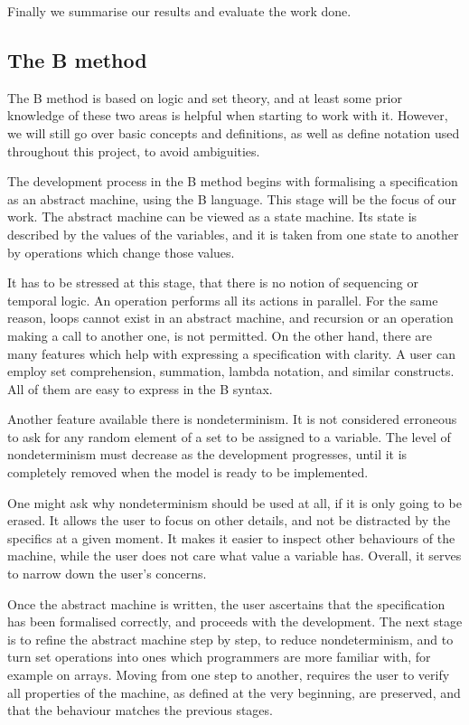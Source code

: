 \documentclass[12pt,journal,duplex]{IEEEtran}
\begin{document}
	Finally we summarise our results and evaluate the work done.

	\subsection{The B method}
	The B method is based on logic and set theory, and at least some prior knowledge of these two areas is helpful when starting to work with it. However, we will still go over basic concepts and definitions, as well as define notation used throughout this project, to avoid ambiguities.

	The development process in the B method begins with formalising a specification as an abstract machine, using the B language. This stage will be the focus of our work. The abstract machine can be viewed as a state machine. Its state is described by the values of the variables, and it is taken from one state to another by operations which change those values.

	It has to be stressed at this stage, that there is no notion of sequencing or temporal logic. An operation performs all its actions in parallel. For the same reason, loops cannot exist in an abstract machine, and recursion or an operation making a call to another one, is not permitted. On the other hand, there are many features which help with expressing a specification with clarity. A user can employ set comprehension, summation, lambda notation, and similar constructs. All of them are easy to express in the B syntax.

	Another feature available there is nondeterminism. It is not considered erroneous to ask for any random element of a set to be assigned to a variable. The level of nondeterminism must decrease as the development progresses, until it is completely removed when the model is ready to be implemented.

	One might ask why nondeterminism should be used at all, if it is only going to be erased. It allows the user to focus on other details, and not be distracted by the specifics at a given moment. It makes it easier to inspect other behaviours of the machine, while the user does not care what value a variable has. Overall, it serves to narrow down the user's concerns.

	Once the abstract machine is written, the user ascertains that the specification has been formalised correctly, and proceeds with the development. The next stage is to refine the abstract machine step by step, to reduce nondeterminism, and to turn set operations into ones which programmers are more familiar with, for example on arrays. Moving from one step to another, requires the user to verify all properties of the machine, as defined at the very beginning, are preserved, and that the behaviour matches the previous stages.
\end{document}
